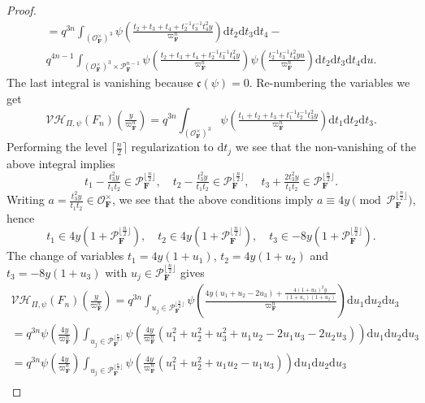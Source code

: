 \documentclass[A4]{amsart}
\numberwithin{equation}{section} \everymath{\displaystyle}
\newcommand{\ud}{\mathrm{d}}
\newcommand{\F}{\mathbf{F}}
\newcommand{\vO}{\mathcal{O}}
\newcommand{\vP}{\mathcal{P}}
\newcommand{\VorH}{\mathcal{VH}}
\newcommand{\cond}{\mathfrak{c}}
\begin{document}
\begin{proof}
\begin{multline*}
	= q^{3n} \int_{(\vO_{\F}^{\times})^3} \psi \left( \tfrac{t_2+t_3+t_4 + t_2^{-1}t_3^{-1}t_4^2y}{\varpi_{\F}^n} \right) \ud t_2 \ud t_3 \ud t_4 - \\
	q^{4n-1} \int_{(\vO_{\F}^{\times})^3 \times \vP_{\F}^{n-1}} \psi \left( \tfrac{t_2+t_3+t_4 + t_2^{-1}t_3^{-1}t_4^2y}{\varpi_{\F}^n} \right) \psi \left( \tfrac{t_2^{-1}t_3^{-1}t_4^2y u}{\varpi_{\F}^n} \right) \ud t_2 \ud t_3 \ud t_4 \ud u.
\end{multline*}
	The last integral is vanishing because $\cond(\psi)=0$. Re-numbering the variables we get
	$$ \VorH_{\Pi,\psi}(F_n) \left( \tfrac{y}{\varpi_{\F}^n} \right) = q^{3n} \int_{(\vO_{\F}^{\times})^3} \psi \left( \tfrac{t_1+t_2+t_3 + t_1^{-1}t_2^{-1}t_3^2 y}{\varpi_{\F}^n} \right) \ud t_1 \ud t_2 \ud t_3. $$
	Performing the level $\lceil \tfrac{n}{2} \rceil$ regularization to $\ud t_j$ we see that the non-vanishing of the above integral implies
	$$ t_1 - \tfrac{t_3^2 y}{t_1 t_2} \in \vP_{\F}^{\lfloor \frac{n}{2} \rfloor}, \quad t_2 - \tfrac{t_3^2 y}{t_1 t_2} \in \vP_{\F}^{\lfloor \frac{n}{2} \rfloor}, \quad t_3 + \tfrac{2 t_3^2 y}{t_1 t_2} \in \vP_{\F}^{\lfloor \frac{n}{2} \rfloor}. $$
	Writing $a = \tfrac{t_3^2 y}{t_1 t_2} \in \vO_{\F}^{\times}$, we see that the above conditions imply $a \equiv 4 y \pmod{\vP_{\F}^{\lfloor \frac{n}{2} \rfloor}}$, hence
	$$ t_1 \in 4y \left( 1 + \vP_{\F}^{\lfloor \frac{n}{2} \rfloor} \right), \quad t_2 \in 4y \left( 1 + \vP_{\F}^{\lfloor \frac{n}{2} \rfloor} \right), \quad t_3 \in -8y \left( 1 + \vP_{\F}^{\lfloor \frac{n}{2} \rfloor} \right). $$
	The change of variables $t_1 = 4y(1+u_1)$, $t_2 = 4y(1+u_2)$ and $t_3 = -8y(1+u_3)$ with $u_j \in \vP_{\F}^{\lfloor \frac{n}{2} \rfloor}$ gives
\begin{multline*}
	\VorH_{\Pi,\psi}(F_n) \left( \tfrac{y}{\varpi_{\F}^n} \right) = q^{3n} \int_{u_j \in \vP_{\F}^{\lfloor \frac{n}{2} \rfloor}} \psi \left( \frac{4y(u_1+u_2-2u_3) + \frac{4(1+u_3)^2y}{(1+u_1)(1+u_2)} }{\varpi_{\F}^n} \right) \ud u_1 \ud u_2 \ud u_3 \\
	= q^{3n} \psi \left( \tfrac{4y}{\varpi_{\F}^n} \right) \int_{u_j \in \vP_{\F}^{\lfloor \frac{n}{2} \rfloor}} \psi \left( \tfrac{4y}{\varpi_{\F}^n} \left( u_1^2 + u_2^2 + u_3^2 + u_1u_2 - 2u_1u_3 - 2u_2u_3 \right) \right) \ud u_1 \ud u_2 \ud u_3 \\
	= q^{3n} \psi \left( \tfrac{4y}{\varpi_{\F}^n} \right) \int_{u_j \in \vP_{\F}^{\lfloor \frac{n}{2} \rfloor}} \psi \left( \tfrac{4y}{\varpi_{\F}^n} \left( u_1^2 + u_2^2 + u_1u_2 - u_1u_3 \right) \right) \ud u_1 \ud u_2 \ud u_3 \\

\end{multline*}
\end{proof}
\end{document}
